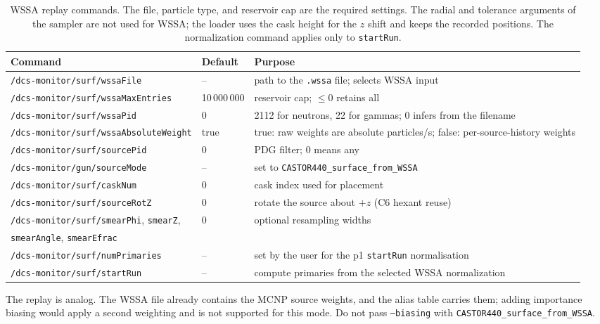 \documentclass[11pt,a4paper]{article}
\begin{document}
\begin{table}[t]
\centering
\caption{WSSA replay commands.  The file, particle type, and reservoir cap are
the required settings.  The radial and tolerance arguments of the sampler are
not used for WSSA; the loader uses the cask height for the $z$ shift and keeps
the recorded positions.  The normalization command applies only to
\texttt{startRun}.}
\label{tab:commands}
\footnotesize
\begin{tabular}{@{}l l p{7.4cm}@{}}
\toprule
Command & Default & Purpose \\
\midrule
\texttt{/dcs-monitor/surf/wssaFile} & -- & path to the \texttt{.wssa} file; selects WSSA input \\
\texttt{/dcs-monitor/surf/wssaMaxEntries} & 10\,000\,000 & reservoir cap; $\le0$ retains all \\
\texttt{/dcs-monitor/surf/wssaPid} & 0 & 2112 for neutrons, 22 for gammas; 0 infers from the filename \\
\texttt{/dcs-monitor/surf/wssaAbsoluteWeight} & true & true: raw weights are absolute particles/s; false: per-source-history weights \\
\texttt{/dcs-monitor/surf/sourcePid} & 0 & PDG filter; 0 means any \\
\texttt{/dcs-monitor/gun/sourceMode} & -- & set to \texttt{CASTOR440\_surface\_from\_WSSA} \\
\texttt{/dcs-monitor/surf/caskNum} & 0 & cask index used for placement \\
\texttt{/dcs-monitor/surf/sourceRotZ} & 0 & rotate the source about $+z$ (C6 hexant reuse) \\
\texttt{/dcs-monitor/surf/smearPhi}, \texttt{smearZ}, & 0 & optional resampling widths \\
\texttt{smearAngle}, \texttt{smearEfrac} & & \\
\texttt{/dcs-monitor/surf/numPrimaries} & -- & set by the user for the p1 \texttt{startRun} normalisation \\
\texttt{/dcs-monitor/surf/startRun} & -- & compute primaries from the selected WSSA normalization \\
\bottomrule
\end{tabular}
\end{table}

The replay is analog.  The WSSA file already contains the MCNP source weights,
and the alias table carries them; adding importance biasing would apply a second
weighting and is not supported for this mode.  Do not pass \texttt{--biasing}
with \texttt{CASTOR440\_surface\_from\_WSSA}.
\end{document}
